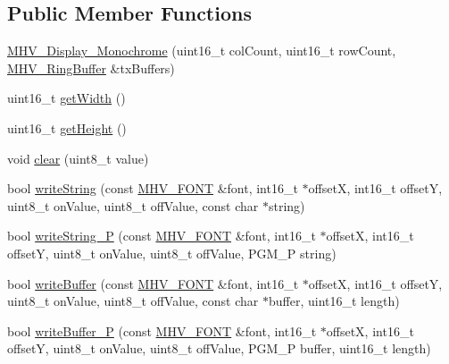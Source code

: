 \subsection*{\-Public \-Member \-Functions}
\begin{DoxyCompactItemize}
\item 
\hyperlink{class_m_h_v___display___monochrome_ae9bac3772b5baa006b04121c0caf0d8b}{\-M\-H\-V\-\_\-\-Display\-\_\-\-Monochrome} (uint16\-\_\-t col\-Count, uint16\-\_\-t row\-Count, \hyperlink{class_m_h_v___ring_buffer}{\-M\-H\-V\-\_\-\-Ring\-Buffer} \&tx\-Buffers)
\item 
uint16\-\_\-t \hyperlink{class_m_h_v___display___monochrome_aff729b2192d8f862c2c58442bef44f3d}{get\-Width} ()
\item 
uint16\-\_\-t \hyperlink{class_m_h_v___display___monochrome_a66fe24dc111d1a2b224951bfa2eae853}{get\-Height} ()
\item 
void \hyperlink{class_m_h_v___display___monochrome_a25b062aefde440ad5c47dbca98b5b478}{clear} (uint8\-\_\-t value)
\item 
bool \hyperlink{class_m_h_v___display___monochrome_a4f56f6dd2d51352e527f53bb244e3543}{write\-String} (const \hyperlink{_m_h_v___font_8h_ab7088ba808ac223275dfd526d198356f}{\-M\-H\-V\-\_\-\-F\-O\-N\-T} \&font, int16\-\_\-t $\ast$offset\-X, int16\-\_\-t offset\-Y, uint8\-\_\-t on\-Value, uint8\-\_\-t off\-Value, const char $\ast$string)
\item 
bool \hyperlink{class_m_h_v___display___monochrome_acacf2c72fd60a1a7cbdcf25e1cd93920}{write\-String\-\_\-\-P} (const \hyperlink{_m_h_v___font_8h_ab7088ba808ac223275dfd526d198356f}{\-M\-H\-V\-\_\-\-F\-O\-N\-T} \&font, int16\-\_\-t $\ast$offset\-X, int16\-\_\-t offset\-Y, uint8\-\_\-t on\-Value, uint8\-\_\-t off\-Value, \-P\-G\-M\-\_\-\-P string)
\item 
bool \hyperlink{class_m_h_v___display___monochrome_a68bf57213233e288474c9b51491452df}{write\-Buffer} (const \hyperlink{_m_h_v___font_8h_ab7088ba808ac223275dfd526d198356f}{\-M\-H\-V\-\_\-\-F\-O\-N\-T} \&font, int16\-\_\-t $\ast$offset\-X, int16\-\_\-t offset\-Y, uint8\-\_\-t on\-Value, uint8\-\_\-t off\-Value, const char $\ast$buffer, uint16\-\_\-t length)
\item 
bool \hyperlink{class_m_h_v___display___monochrome_ad2318af5f3a5f7db01debd52a5bc4bc1}{write\-Buffer\-\_\-\-P} (const \hyperlink{_m_h_v___font_8h_ab7088ba808ac223275dfd526d198356f}{\-M\-H\-V\-\_\-\-F\-O\-N\-T} \&font, int16\-\_\-t $\ast$offset\-X, int16\-\_\-t offset\-Y, uint8\-\_\-t on\-Value, uint8\-\_\-t off\-Value, \-P\-G\-M\-\_\-\-P buffer, uint16\-\_\-t length)

\end{DoxyCompactItemize}
